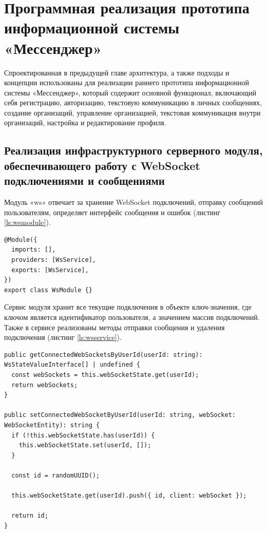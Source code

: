 \chapter{Программная реализация прототипа информационной системы «Мессенджер»}

Спроектированная в предыдущей главе архитектура, а также подходы и концепции использованы для реализации раннего прототипа информационной системы «Мессенджер», который содержит основной функционал, включающий себя регистрацию, авторизацию, текстовую коммуникацию в личных сообщениях, создание организаций, управление организацией, текстовая коммуникация внутри организаций, настройка и редактирование профиля.

\section{Реализация инфраструктурного серверного модуля, обеспечивающего работу с WebSocket подключениями и сообщениями}

Модуль «ws» отвечает за хранение WebSocket подключений, отправку сообщений пользователям, определяет интерфейс сообщения и ошибок (листинг \ref{ls:wsmodule}).

\begin{lstlisting}[caption={Модуль работы с WebSocket подключениями}, label={ls:wsmodule}]
@Module({
  imports: [],
  providers: [WsService],
  exports: [WsService],
})
export class WsModule {}
\end{lstlisting}

Сервис модуля хранит все текущие подключения в объекте ключ-значения, где ключом является идентификатор пользователя, а значением массив подключений. Также в сервисе реализованы методы отправки сообщения и удаления подключения (листинг \ref{ls:wsservice}).

\begin{lstlisting}[caption={Примеры методов сервиса WsService}, label={ls:wsservice}]
public getConnectedWebSocketsByUserId(userId: string): WsStateValueInterface[] | undefined {
  const webSockets = this.webSocketState.get(userId);
  return webSockets;
}

public setConnectedWebSocketByUserId(userId: string, webSocket: WebSocketEntity): string {
  if (!this.webSocketState.has(userId)) {
    this.webSocketState.set(userId, []);
  }

  const id = randomUUID();

  this.webSocketState.get(userId).push({ id, client: webSocket });

  return id;
}
\end{lstlisting}

